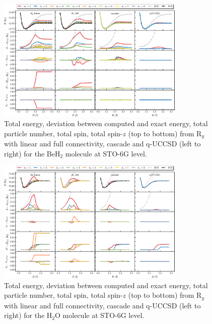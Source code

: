 \documentclass[aps,pra,twocolumn]{revtex4-2}
\begin{document}
\begin{figure}[t!]
\includegraphics[width=0.8\textwidth]{../figures/second_quantization_beh2/second_quantization_beh2.eps}
\caption{Total energy, deviation between computed and exact energy, total particle number, total spin, total spin-$z$ (top to bottom) from R$_y$ with linear and full connectivity, cascade and q-UCCSD (left to right) for the BeH$_2$ molecule at STO-6G level.}
\label{figure:second_beh2}
\end{figure}

\begin{figure}[t!]
\includegraphics[width=0.8\textwidth]{../figures/second_quantization_h2o/second_quantization_h2o.eps}
\caption{Total energy, deviation between computed and exact energy, total particle number, total spin, total spin-$z$ (top to bottom) from R$_y$ with linear and full connectivity, cascade and q-UCCSD (left to right) for the H$_2$O molecule at STO-6G level.}
\label{figure:second_h2o}
\end{figure} 
\end{document}
